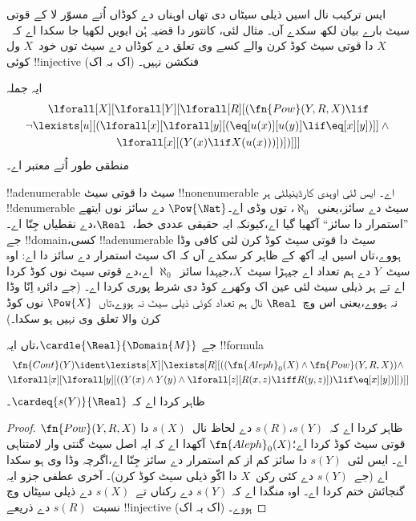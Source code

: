 \documentclass[../../../include/open-logic-section]{subfiles}
\begin{document}
\begin{explain}
ایس ترکیب نال اسیں ذیلی سیٹاں دی تھاں اوہناں دے کوڈاں اُتے
مسوّر لا کے قوتی سیٹ بارے بیان لکھ سکدے آں۔ مثال لئی، کانتور دا
قضیہ ہُن ایویں لکھیا جا سکدا اے کہ~$X$
دا قوتی سیٹ کوڈ کرن والے کسے وی تعلق دے کوڈاں دے سیٹ توں
خود~$X$ ول کوئی !!{injective} (اک بہ اک) فنکشن نہیں۔
\end{explain}

\begin{prop}
ایہ جملہ
\begin{multline*}
  \lforall[X][\lforall[Y][\lforall[R][(\fn{Pow}(Y, R, X) \lif \\
      \lnot \lexists[u][(\lforall[x][\lforall[y][(\eq[u(x)][u(y)] \lif
            \eq[x][y])]] \land {}\\
        \lforall[x][(Y(x) \lif X(u(x)))])])]]]
\end{multline*}
منطقی طور اُتے معتبر اے۔
\end{prop}

\begin{explain}
!!a{denumerable} سیٹ دا قوتی سیٹ !!{nonenumerable} اے۔ ایس لئی اوہدی
کارڈینیلٹی ہر !!{denumerable} سیٹ دے سائز،یعنی~$\aleph_0$،
توں وڈی اے۔$\Pow{\Nat}$ دے سائز نوں ایتھے ”استمرار دا سائز“
آکھیا گیا اے،کیونکہ ایہ حقیقی عددی خط،~$\Real$،دے نقطیاں
جِنّا اے۔جے !!{domain}،کسی !!a{denumerable} سیٹ دا قوتی سیٹ
کوڈ کرن لئی کافی وڈا ہووے،تاں اسیں ایہ آکھ کے ظاہر کر سکدے آں
کہ اک سیٹ استمرار دے سائز دا اے: اوہ سیٹ~$Y$ دے ہم تعداد اے
جیہڑا سیٹ~$X$،جیہدا سائز~$\aleph_0$ اے،دے قوتی سیٹ نوں
کوڈ کردا اے تے ہر ذیلی سیٹ لئی عین اک وکھرے کوڈ دی شرط پوری کردا اے۔ (جے دائرہ اِنّا وڈا نہ
ہووے،یعنی اس وچ~$\Real$
نال ہم تعداد کوئی ذیلی سیٹ نہ ہووے،تاں~$\Pow{X}$ نوں کوڈ کرن
والا تعلق وی نہیں ہو سکدا۔)
\end{explain}

\begin{prop}
جے $\cardle{\Real}{\Domain{M}}$،تاں ایہ !!{formula}
\begin{multline*}
\fn{Cont}(Y) \ident 
\lexists[X][\lexists[R][((\fn{Aleph}_0(X) \land
      \fn{Pow}(Y, R, X)) \land \\ 
      \lforall[x][\lforall[y][((Y(x) \land {} 
      Y(y) \land \lforall[z][R(x,z) \liff R(y,z)]) \lif \eq[x][y])]])]]
\end{multline*}
ظاہر کردا اے کہ $\cardeq{s(Y)}{\Real}$۔
\end{prop}

\begin{proof}
  $\fn{Pow}(Y, R, X)$ ظاہر کردا اے کہ~$s(Y)$،$s(R)$ دے
  لحاظ نال~$s(X)$ دا قوتی سیٹ کوڈ کردا اے؛$\fn{Aleph}_0(X)$
  آکھدا اے کہ ایہ اصل سیٹ گنتی وار لامتناہی اے۔ ایس لئی~$s(Y)$ دا
  سائز کم از کم استمرار دے سائز جِنّا اے،اگرچہ وڈا وی ہو سکدا اے
  (جے~$s(Y)$ دے کئی رکن~$X$ دا اکّو ذیلی سیٹ کوڈ کرن)۔ آخری
  عطفی جزو ایہ گنجائش ختم کردا اے۔ اوہ منگدا اے کہ
  $s(Y)$ دے رکناں تے~$s(X)$ دے ذیلی سیٹاں وچ نسبت~$s(R)$
  دے ذریعے !!{injective} (اک بہ اک) ہووے۔
\end{proof}
\end{document}

